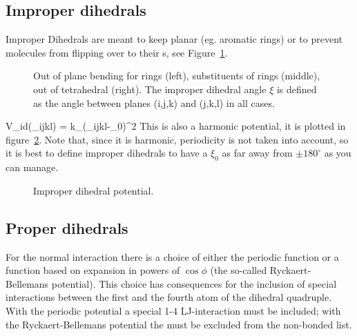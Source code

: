 \newcommand{\rvkj}{{\bf r}_{kj}}
\newcommand{\rkj}{r_{kj}}

\subsection{Improper dihedrals}
Improper Dihedrals are meant to keep  planar (eg. 
aromatic rings) or to prevent molecules from flipping over to their
s, see Figure~\ref{Fig:imp}.

\begin {figure}
\centerline{\hspace{1cm}
\hspace{1cm}}
\caption[Improper dihedral types.]{Out of plane bending for rings (left), substituents of rings (middle), out of tetrahedral (right). The improper dihedral angle $\xi$ is defined as the angle between planes (i,j,k) and (j,k,l) in all cases.}
\label{Fig:imp}
\end {figure}

\beq
V_{id}(\xi_{ijkl}) = k_{\xi}(\xi_{ijkl}-\xi_0)^2
\eeq
This is also a harmonic potential, it is plotted in
figure~\ref{fig:imps}. Note that, since it is harmonic, periodicity is
not taken into account, so it is best to define improper dihedrals
to have a $\xi_0$ as far away from $\pm 180^\circ$ as you can manage.

\begin{figure}
\centerline{}
\caption {Improper dihedral potential.}
\label{fig:imps}
\end{figure}

\subsection{Proper dihedrals}
For the normal  interaction there is a choice of either the
{\gromos} periodic function or a function based on expansion in powers of
$\cos \phi$ (the so-called Ryckaert-Bellemans potential). This choice
has consequences for the inclusion of special interactions between the
first and the fourth atom of the dihedral quadruple. With the periodic
{\gromos} potential a special 1-4 LJ-interaction must be included; with
the Ryckaert-Bellemans potential the  
must be excluded from the non-bonded list.  

